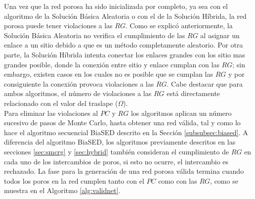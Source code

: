 Una vez que la red porosa ha sido inicializada por completo, ya sea con el algoritmo de la Solución Básica Aleatoria 
 o con el de la Solución Híbrida, la red porosa puede tener violaciones a las $RG$.
Como se explic\'o anteriormente, la Solución Básica Aleatoria no verifica el cumplimiento de las $RG$ al asignar un enlace a 
un sitio debido a que es un método completamente aleatorio. Por otra parte, la Solución Híbrida intenta conectar los enlaces grandes 
con los sitio mas grandes posible, donde la conexión entre sitio y enlace cumplan con las $RG$; sin embargo, existen casos 
en los cuales no es posible que se cumplan las $RG$ y por consiguiente la conexión provoca violaciones a las $RG$. 
Cabe destacar que para ambos algoritmos, el número de violaciones a las $RG$ est\'a directamente relacionado con el 
valor del traslape ($\Omega$).\\



Para eliminar las violaciones al $PC$ y $RG$ los algoritmos aplican un n\'umero sucesivo de pasos de Monte Carlo, hasta obtener 
una red v\'alida, tal y como lo hace el algoritmo secuencial BiaSED 
descrito en la Sección \ref{subsubsec:biased}. A diferencia del algoritmo BiaSED, los algoritmos previamente descritos 
 en las secciones \ref{sec:smcrg} y \ref{sec:hybrid} tambi\'en consideran el cumplimiento 
de $RG$ en cada uno de los intercambios de poros, si esto no ocurre, el intercambio es rechazado. La fase para la generación de una 
red porosa válida termina cuando todos los poros en la red cumplen tanto con el $PC$ como con las $RG$, como se muestra en 
el Algoritmo \ref{alg:validnet}.\\


